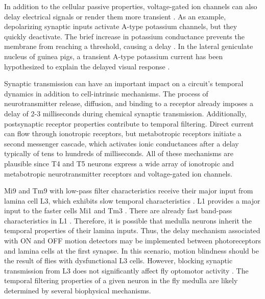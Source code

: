 In addition to the cellular passive properties, voltage-gated ion channels can also delay electrical signals or render them more transient \parencite{Destexhe1999}. As an example, depolarizing synaptic inputs activate A-type potassium channels, but they quickly deactivate. The brief increase in potassium conductance prevents the membrane from reaching a threshold, causing a delay \parencite{Groschner2018}. In the lateral geniculate nucleus of guinea pigs, a transient A-type potassium current has been hypothesized to explain the delayed visual response \parencite{Mccormick1991}.

Synaptic transmission can have an important impact on a circuit's temporal dynamics in addition to cell-intrinsic mechanisms. The process of neurotransmitter release, diffusion, and binding to a receptor already imposes a delay of 2-3 milliseconds during chemical synaptic transmission. Additionally, postsynaptic receptor properties contribute to temporal filtering. Direct current can flow through ionotropic receptors, but metabotropic receptors initiate a second messenger cascade, which activates ionic conductances after a delay typically of tens to hundreds of milliseconds. All of these mechanisms are plausible since T4 and T5 neurons express a wide array of ionotropic and metabotropic neurotransmitter receptors and voltage-gated ion channels. 

Mi9 and Tm9 with low-pass filter characteristics receive their major input from lamina cell L3, which exhibits slow temporal characteristics \parencite{Silies2013}. L1 provides a major input to the faster cells Mi1 and Tm3 \parencite{Takemura2017}. There are already fast band-pass characteristics in L1 \parencite{Clark2011, Reiff2010, Drews2020}. Therefore, it is possible that medulla neurons inherit the temporal properties of their lamina inputs. Thus, the delay mechanism associated with ON and OFF motion detectors may be implemented between photoreceptors and lamina cells at the first synapse. In this scenario, motion blindness should be the result of flies with dysfunctional L3 cells. However, blocking synaptic transmission from L3 does not significantly affect fly optomotor activity \parencite{Bahl2015, Silies2013, Tuthill2013}. The temporal filtering properties of a given neuron in the fly medulla are likely determined by several biophysical mechanisms.

